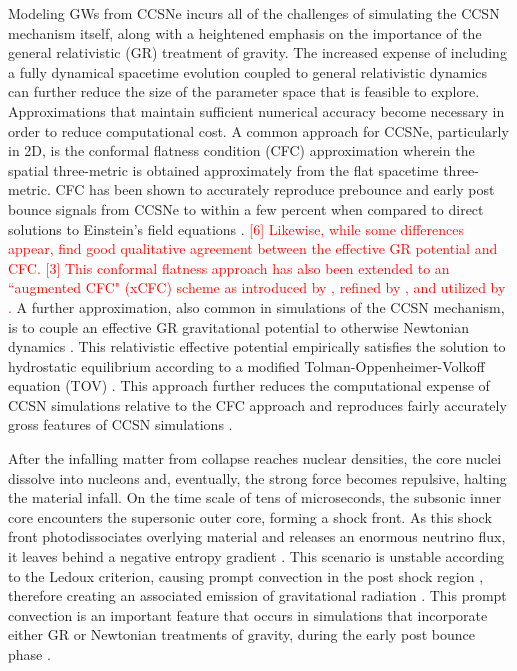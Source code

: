 \documentclass[twocolumn,times]{aastex62}  %
\begin{document}
Modeling GWs from CCSNe incurs all of the challenges of simulating the CCSN mechanism itself, along with a heightened emphasis on the importance of the general relativistic (GR) treatment of gravity. 
The increased expense of including a fully dynamical spacetime evolution coupled to general relativistic dynamics \citep[cf.][]{ott:2009, ott:2012} can further reduce the size of the parameter space that is feasible to explore. 
Approximations that maintain sufficient numerical accuracy become necessary in order to reduce computational cost.  
A common approach for CCSNe, particularly in 2D, is the conformal flatness condition (CFC) approximation wherein the spatial three-metric is obtained approximately from the flat spacetime three-metric.
CFC has been shown to accurately reproduce prebounce and early post bounce signals from CCSNe to within a few percent when compared to direct solutions to Einstein's field equations  \citep{ott:2007}.  \textcolor{red}{[6] Likewise, while some differences appear, \citet{shibata:2004} find good qualitative agreement between the effective GR potential and CFC.  [3] This conformal flatness approach has also been extended to an ``augmented CFC" (xCFC) scheme as introduced by \citet{saijo:2004}, refined by \citet{cordero-carrion:2009}, and utilized by \citet{bmuller:2019}.}
A further approximation, also common in simulations of the CCSN mechanism, is to couple an effective GR gravitational potential to otherwise Newtonian dynamics \citep{rampp:2002, marek:2006, bruenn:2016, oconnor:2018, morozova:2018}.  
This relativistic effective potential empirically satisfies the solution to hydrostatic equilibrium according to a modified Tolman-Oppenheimer-Volkoff equation (TOV) \citep{rampp:2002, marek:2006}.
This approach further reduces the computational expense of CCSN simulations relative to the CFC approach and reproduces fairly accurately gross features of CCSN simulations \citep{marek:2006, muller:2012,oconnor:2018}.  

After the infalling matter from collapse reaches nuclear densities, the core nuclei dissolve into nucleons and, eventually, the strong force becomes repulsive, halting the material infall.  On the time scale of tens of microseconds, the subsonic inner core encounters the supersonic outer core, forming a shock front.  As this shock front photodissociates overlying material and releases an enormous neutrino flux, it leaves behind a negative entropy gradient \citep{mazurek:1982,bruenn:1985,bruenn:1989}.  This scenario is unstable according to the Ledoux criterion, causing prompt convection in the post shock region \citep{burrows:1992}, therefore creating an associated emission of gravitational radiation \citep{marek:2009b,ott:2009}.  This prompt convection is an important feature that occurs in simulations that incorporate either GR or Newtonian treatments of gravity, during the early post bounce phase \citep{muller:2017,richers:2017,nagakura:2018}.
\end{document}
